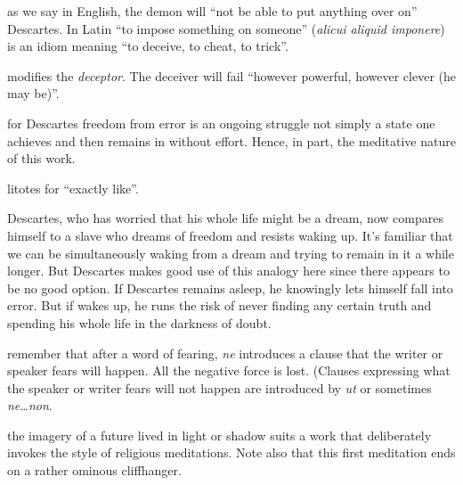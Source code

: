  as we say in English, the demon will ``not be able to put anything over on'' Descartes. In Latin ``to impose something on someone'' (\textit{alicui aliquid imponere}) is an idiom meaning ``to deceive, to cheat, to trick''.

 modifies the \textit{deceptor}. The deceiver will fail ``however powerful, however clever (he may be)''.

 for Descartes freedom from error is an ongoing struggle not simply a state one achieves and then remains in without effort. Hence, in part, the meditative nature of this work.

 litotes for ``exactly like''.

 Descartes, who has worried that his whole life might be a dream, now compares himself to a slave who dreams of freedom and resists waking up. It's familiar that we can be simultaneously waking from a dream and trying to remain in it a while longer. But Descartes makes good use of this analogy here since there appears to be no good option. If Descartes remains asleep, he knowingly lets himself fall into error. But if wakes up, he runs the risk of never finding any certain truth and spending his whole life in the darkness of doubt.

 remember that after a word of fearing, \textit{ne} introduces a clause that the writer or speaker fears will happen. All the negative force is lost. (Clauses expressing what the speaker or writer fears will not happen are introduced by \textit{ut} or sometimes \textit{ne\dots non}.

 the imagery of a future lived in light or shadow suits a work that deliberately invokes the style of religious meditations. Note also that this first meditation ends on a rather ominous cliffhanger.

